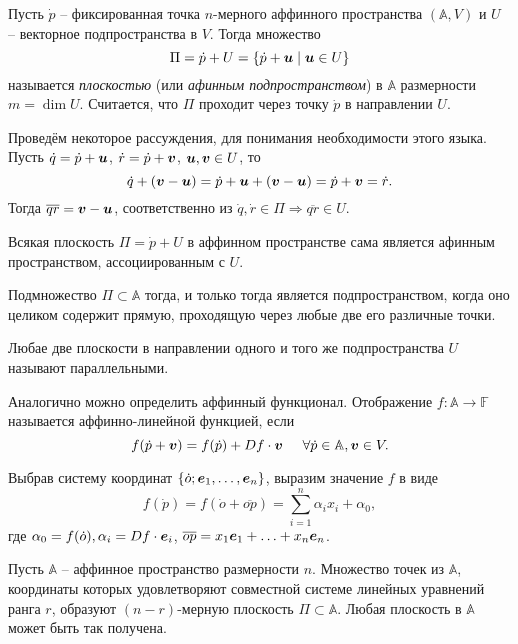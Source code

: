 \begin{to_def} 
     Пусть $\dot p$ -- фиксированная точка $n$-мерного аффинного пространства $(\mathbb{A}, V)$ и $U$ -- векторное подпространства в $V$. Тогда множество
     $$
         \Pi = \dot p + U = \{\dot p + \mbox{\boldmath $u$} \mid \mbox{\boldmath $u$} \in U\}
     $$
     называется \textit{плоскостью} (или \textit{афинным подпространством}) в $\mathbb{A}$ размерности $m  =\dim U$. Считается, что $\Pi$ проходит через точку $\dot p$ в направлении $U$. 
\end{to_def}

Проведём некоторое рассуждения, для понимания необходимости этого языка. Пусть $\dot q = \dot p + \mbox{\boldmath $u$}$, $\dot r = \dot p + \mbox{\boldmath $v$}$, \; $\mbox{\boldmath $u$}, \mbox{\boldmath $v$} \in U$, то
$$
    \dot q + (\mbox{\boldmath $v$} - \mbox{\boldmath $u$}) = \dot p + \mbox{\boldmath $u$} + (\mbox{\boldmath $v$} - \mbox{\boldmath $u$}) = \dot p + \mbox{\boldmath $v$} = \dot r.
$$
Тогда $\overline{qr} = \mbox{\boldmath $v$} - \mbox{\boldmath $u$}$, соответственно из $\dot q, \dot r \in \Pi \Longrightarrow \overline{qr} \in U$.

\begin{to_thr} 
    Всякая плоскость $\Pi = \dot p + U$  в аффинном пространстве сама является афинным пространством, ассоциированным с $U$.
\end{to_thr}

\begin{to_thr} 
    Подмножество $\Pi \subset \mathbb{A}$ тогда, и только тогда является подпространством, когда оно целиком содержит прямую, проходящую через любые две его различные точки.
\end{to_thr}

\begin{to_def} 
    Любае две плоскости в направлении одного и того же подпространства $U$ называют параллельными.
\end{to_def}

Аналогично можно определить аффинный функционал. Отображение $f \colon \mathbb{A} \to \mathbb{F}$ называется аффинно-линейной функцией, если
$$
    f(\dot p + \mbox{\boldmath $v$}) = f(\dot p) + D f \cdot \mbox{\boldmath $v$} \hspace{0.5cm} 
    \forall \dot p \in \mathbb{A}, \mbox{\boldmath $v$} \in V.
$$

Выбрав систему координат $\{\dot o; \mbox{\boldmath $e$}_1, \ldots, \mbox{\boldmath $e$}_n\}$, выразим значение $f$ в виде
$$
    f(\dot p) = f(\dot o + \overline{op}) = \sum_{i=1}^n \alpha_i x_i + \alpha_0,
$$
где $\alpha_0 = f(\dot o), \alpha_i = D f \cdot \mbox{\boldmath $e$}_i$, $\overline{op} = x_1 \mbox{\boldmath $e$}_1 + \ldots + x_n \mbox{\boldmath $e$}_n$.


\begin{to_thr} 
    Пусть $\mathbb{A}$ -- аффинное пространство размерности $n$. Множество точек из $\mathbb{A}$, координаты которых удовлетворяют совместной системе линейных уравнений ранга $r$, образуют $(n-r)$-мерную плоскость $\Pi \subset \mathbb{A}$. Любая плоскость в $\mathbb{A}$ может быть так получена.
\end{to_thr}

